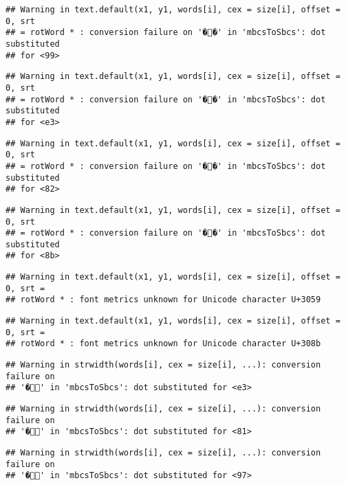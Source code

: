 \documentclass[]{article}
\begin{document}
\begin{verbatim}
## Warning in text.default(x1, y1, words[i], cex = size[i], offset = 0, srt
## = rotWord * : conversion failure on '��' in 'mbcsToSbcs': dot substituted
## for <99>
\end{verbatim}

\begin{verbatim}
## Warning in text.default(x1, y1, words[i], cex = size[i], offset = 0, srt
## = rotWord * : conversion failure on '��' in 'mbcsToSbcs': dot substituted
## for <e3>
\end{verbatim}

\begin{verbatim}
## Warning in text.default(x1, y1, words[i], cex = size[i], offset = 0, srt
## = rotWord * : conversion failure on '��' in 'mbcsToSbcs': dot substituted
## for <82>
\end{verbatim}

\begin{verbatim}
## Warning in text.default(x1, y1, words[i], cex = size[i], offset = 0, srt
## = rotWord * : conversion failure on '��' in 'mbcsToSbcs': dot substituted
## for <8b>
\end{verbatim}

\begin{verbatim}
## Warning in text.default(x1, y1, words[i], cex = size[i], offset = 0, srt =
## rotWord * : font metrics unknown for Unicode character U+3059
\end{verbatim}

\begin{verbatim}
## Warning in text.default(x1, y1, words[i], cex = size[i], offset = 0, srt =
## rotWord * : font metrics unknown for Unicode character U+308b
\end{verbatim}

\begin{verbatim}
## Warning in strwidth(words[i], cex = size[i], ...): conversion failure on
## '�' in 'mbcsToSbcs': dot substituted for <e3>
\end{verbatim}

\begin{verbatim}
## Warning in strwidth(words[i], cex = size[i], ...): conversion failure on
## '�' in 'mbcsToSbcs': dot substituted for <81>
\end{verbatim}

\begin{verbatim}
## Warning in strwidth(words[i], cex = size[i], ...): conversion failure on
## '�' in 'mbcsToSbcs': dot substituted for <97>
\end{verbatim}
\end{document}
